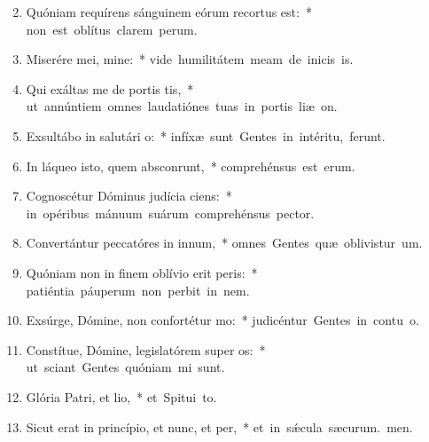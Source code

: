 \begin{flushleft}
\begin{enumerate}[leftmargin=*]
\setcounter{enumi}{1}

\item Quóniam requírens sánguinem eórum recortus est:~* \mbox{non est oblítus clarem perum.}

\item Miserére mei, mine:~* \mbox{vide humilitátem meam de inicis is.}

\item Qui exáltas me de portis tis,~* \mbox{ut annúntiem omnes laudatiónes tuas in portis liæ on.}

\item Exsultábo in salutári o:~* \mbox{infíxæ sunt Gentes in intéritu,  ferunt.}

\item In láqueo isto, quem absconrunt,~* \mbox{comprehénsus est  erum.}

\item Cognoscétur Dóminus judícia ciens:~* \mbox{in opéribus mánuum suárum comprehénsus  pector.}

\item Convertántur peccatóres in innum,~* \mbox{omnes Gentes quæ oblivistur um.}

\item Quóniam non in finem oblívio erit peris:~* \mbox{patiéntia páuperum non perbit in nem.}

\item Exsúrge, Dómine, non confortétur mo:~* \mbox{judicéntur Gentes in contu o.}

\item Constítue, Dómine, legislatórem super os:~* \mbox{ut sciant Gentes quóniam mi sunt.}

\item Glória Patri, et lio,~* \mbox{et Spitui to.}

\item Sicut erat in princípio, et nunc, et per,~* \mbox{et in s\'{\ae}cula sæcurum. men.}

\end{enumerate}
\end{flushleft}

